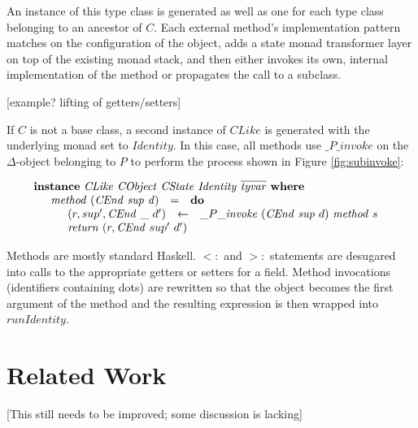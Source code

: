 \documentclass[runningheads,a4paper]{llncs}
\newcommand{\todo}[1]{[{\color{blue}#1}]}
\begin{document}
An instance of this type class is generated as well as one for each type class belonging to an ancestor of $C$. Each external method's implementation pattern matches on the configuration of the object, adds a state monad transformer layer on top of the existing monad stack, and then either invokes its own, internal implementation of the method or propagates the call to a subclass.

\todo{example? lifting of getters/setters}

If $C$ is not a base class, a second instance of $\mathit{CLike}$ is generated with the underlying monad set to $\mathit{Identity}$. In this case, all methods use $\_P\_\mathit{invoke}$ on the $\Delta$-object belonging to $P$ to perform the process shown in Figure \ref{fig:subinvoke}:

\begin{displaymath}
\begin{array}{l}
\mathbf{instance}~\mathit{CLike}~\mathit{CObject}~\mathit{CState}~\mathit{Identity}~\overline{\mathit{tyvar}}~\mathbf{where}\\
\quad \begin{array}{lcl}
\mathit{method}~(\mathit{CEnd}~\mathit{sup}~\mathit{d}) & = & \mathbf{do} \\
\multicolumn{3}{l}{\quad \begin{array}{lcl}
(r,sup',\mathit{CEnd}~\_~d') & \leftarrow & \_P\_\mathit{invoke}~(\mathit{CEnd}~\mathit{sup}~d)~\mathit{method}~s \\
\multicolumn{3}{l}{\mathit{return}~(r, \mathit{CEnd}~sup'~d')}
\end{array}}
\end{array}
\end{array}
\end{displaymath}

Methods are mostly standard Haskell. $<:$ and $>:$ statements are desugared into calls to the appropriate getters or setters for a field. Method invocations (identifiers containing dots) are rewritten so that the object becomes the first argument of the method and the resulting expression is then wrapped into $\mathit{runIdentity}$.

\section{Related Work}
\label{sec:related}

\todo{This still needs to be improved; some discussion is lacking}

\end{document}
